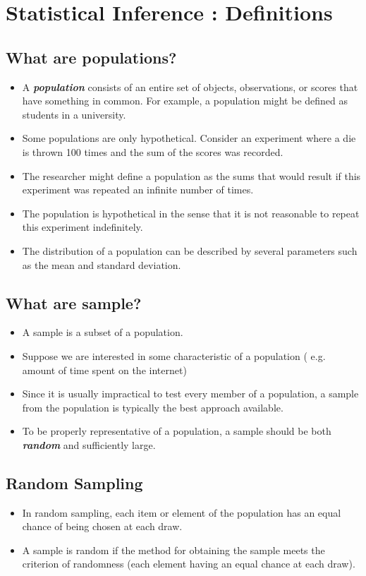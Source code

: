 \documentclass[a4paper,12pt]{article}
\begin{document}
\section*{Statistical Inference : Definitions}
\subsection*{What are populations?}
\begin{itemize}
	\item A \textbf{\emph{population}} consists of an entire set of objects, observations, or scores that have something in common.
	For example, a population might be defined as students in a university.
	
	\item Some populations are only hypothetical. Consider an experiment where a die is thrown 100 times and the sum of the scores was recorded.
	\item The researcher might define a population as the sums that would result if this experiment was repeated an infinite number of times.
	\item The population is hypothetical in the sense that it is not reasonable to repeat this experiment indefinitely.
	\item The distribution of a population can be described by several parameters such as the mean and standard deviation.
	
\end{itemize}

\subsection*{What are sample?}
\begin{itemize}
	
	\item A sample is a subset of a population.
	\item Suppose we are interested in some characteristic of a population ( e.g. amount of time spent on the internet)
	\item Since it is usually impractical to test every member of a population, a sample from the population is typically
	the best approach available.
	\item To be properly representative of a population, a sample should be both \textbf{\emph{ random}} and sufficiently large.
	
	
\end{itemize}

\subsection*{Random Sampling}
\begin{itemize}
	
	\item In random sampling, each item or element of the population has an equal chance of being chosen at each draw.
	\item A sample is random if the method for obtaining the sample meets the criterion of randomness
	(each element having an equal chance at each draw).
	
	
\end{itemize}
\end{document}
